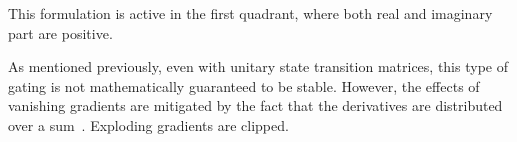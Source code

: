 \documentclass{article}
\begin{document}
This formulation is active in the first quadrant, where both real and imaginary part are positive.

As mentioned previously, even with unitary state transition matrices, this type of gating is not mathematically guaranteed to be stable.  However, the effects of vanishing gradients are mitigated by the fact that the derivatives are distributed over a sum~\cite{Hochreiter,cho-al-emnlp14}. Exploding gradients are clipped.




\end{document}

